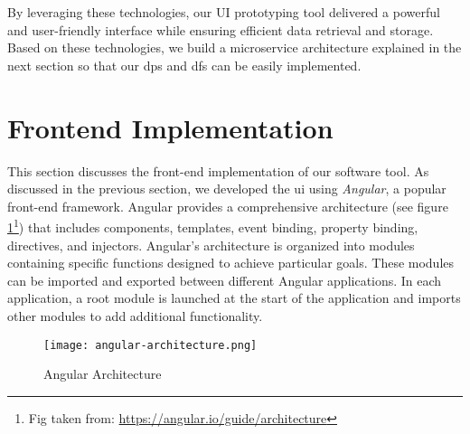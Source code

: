 By leveraging these technologies, our UI prototyping tool delivered a powerful and user-friendly interface while ensuring efficient data retrieval and storage.
Based on these technologies, we build a microservice architecture explained in the next section so that our \ac{dp}s and \ac{df}s can be easily implemented. 
\clearpage


\section{Frontend Implementation}
\label{implementation:section:frontend}

This section discusses the front-end implementation of our software tool. 
As discussed in the previous section, we developed the \ac{ui} using \textit{Angular}, a popular front-end framework. 
Angular provides a comprehensive architecture (see figure \ref{implementation:fig:angulararchitecture}\footnote{Fig taken from: \url{https://angular.io/guide/architecture}}) that includes components, templates, event binding, property binding, directives, and injectors. 
Angular's architecture is organized into modules containing specific functions designed to achieve particular goals. 
These modules can be imported and exported between different Angular applications. 
In each application, a root module is launched at the start of the application and imports other modules to add additional functionality.

\begin{figure}[ht]
    \centering
    \texttt{[image: angular-architecture.png]}
    \caption[Angular Architecture]{Angular Architecture\footnotemark[7]}
    \label{implementation:fig:angulararchitecture}
\end{figure}

